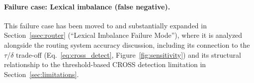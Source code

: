 \documentclass[a4paper,fleql]{cas-sc}
\begin{document}
\paragraph{Failure case: Lexical imbalance (false negative).}
This failure case has been moved to and substantially expanded in
Section~\ref{ssec:router} (``Lexical Imbalance Failure Mode''), where it is
analyzed alongside the routing system accuracy discussion, including its
connection to the $\tau$/$\delta$ trade-off (Eq.~\ref{eq:cross_detect},
Figure~\ref{fig:sensitivity}) and its structural relationship to the
threshold-based CROSS detection limitation in Section~\ref{sec:limitations}.
\end{document}

